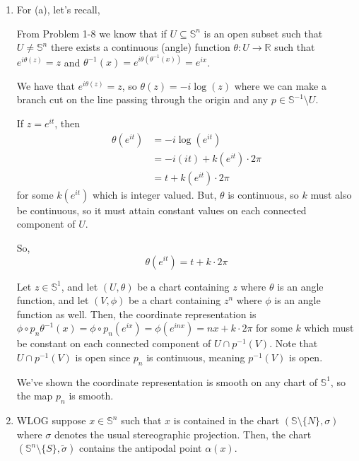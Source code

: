 \documentclass{article}
\newcommand{\R}{\mathbb{R}}
\begin{document}
\begin{enumerate}[label=(\alph*)]
  \item For (a), let's recall,
  \begin{dottedbox}
    From Problem 1-8 we know that if $U \subseteq \mathbb{S}^n$ is an open subset such that $U \neq \mathbb{S}^n$ there exists a continuous (angle) function $\theta : U \rightarrow \R$ such that $e^{i \theta(z)} = z$ and $\theta^{-1}(x) = e^{i\theta (\theta^{-1}(x))} = e^{ix}$. 

    \vskip 0.5cm
    We have that $e^{i \theta(z)} = z$, so $\theta(z) = -i\log(z)$ where we can make a branch cut on the line passing through the origin and any $p \in \mathbb{S}^{-1} \setminus U$.

    \vskip 0.5cm
    If $z = e^{it}$, then 
    \begin{align}
      \theta(e^{it}) &= -i \log(e^{it}) \\
      &= -i (it) + k(e^{it}) \cdot 2\pi \\
      &= t + k(e^{it}) \cdot 2 \pi
    \end{align}
    for some $k(e^{it})$ which is integer valued. But, $\theta$ is continuous, so $k$ must also be continuous, so it must attain constant values on each connected component of $U$. 

    So, 
    \[ \theta(e^{it}) = t + k \cdot 2\pi  \]
  \end{dottedbox}

  \vskip 0.5cm
  Let $z \in \mathbb{S}^1$, and let $(U, \theta)$ be a chart containing $z$ where $\theta$ is an angle function, and let $(V, \phi)$ be a chart containing $z^n$ where $\phi$ is an angle function as well. Then, the coordinate representation is
  $\phi \circ p_n \theta^{-1}(x) = \phi \circ p_n(e^{ix}) = \phi(e^{inx}) = nx + k \cdot 2\pi$ for some $k$ which must be  constant on each connected component of $U \cap p^{-1}(V)$. Note that $U \cap p^{-1}(V)$ is open since $p_n$ is continuous, meaning $p^{-1}(V)$ is open.

  \vskip 0.5cm
  We've shown the coordinate representation is smooth on any chart of $\mathbb{S}^1$, so the map $p_n$ is smooth.

  \vskip 0.5cm
  \item WLOG suppose $x \in \mathbb{S}^n$ such that $x$ is contained in the chart $(\mathbb{S} \setminus \{N\}, \sigma)$ where $\sigma$ denotes the usual stereographic projection. Then, the chart $(\mathbb{S}^n \setminus \{S\}, \tilde{\sigma})$ contains the antipodal point $\alpha(x)$.
  

\end{enumerate}
\end{document}
